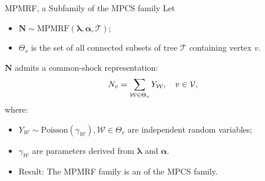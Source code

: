 \documentclass[11pt,xcolor={dvipsnames},hyperref={pdftex,pdfpagemode=UseNone,hidelinks,pdfdisplaydoctitle=true},usepdftitle=false]{beamer}
\begin{document}
\lastslide
\begin{frame}{MPMRF, a Subfamily of the MPCS family}
Let
\begin{itemize}
    \item $\boldsymbol{N} \sim \text{MPMRF}(\boldsymbol{\lambda}, \boldsymbol{\alpha}, \mathcal{T})$;
    \item $\Theta_v$ is the set of all connected subsets of tree $\mathcal{T}$ containing vertex $v$.
    \end{itemize}
\begin{theorem}
$\boldsymbol{N}$ admits a common-shock representation:
    \begin{equation*}
    N_v = \sum_{\mathcal{W} \in \Theta_v} Y_{\mathcal{W}}, \quad v \in \mathcal{V},
    \vspace{-0.5cm}
    \end{equation*}
    where:
    \begin{itemize}
        \item $Y_{\mathcal{W}} \sim \text{Poisson}(\gamma_{\mathcal{W}}), \mathcal{W} \in \Theta_v$ are independent random variables;
        \item $\gamma_{\mathcal{W}}$ are parameters derived from $\boldsymbol{\lambda}$ and $\boldsymbol{\alpha}$.
    \end{itemize}
\end{theorem}
\begin{itemize}
    \item Result: The MPMRF family is an  of the MPCS family. 
\end{itemize}
\end{frame}
\end{document}
